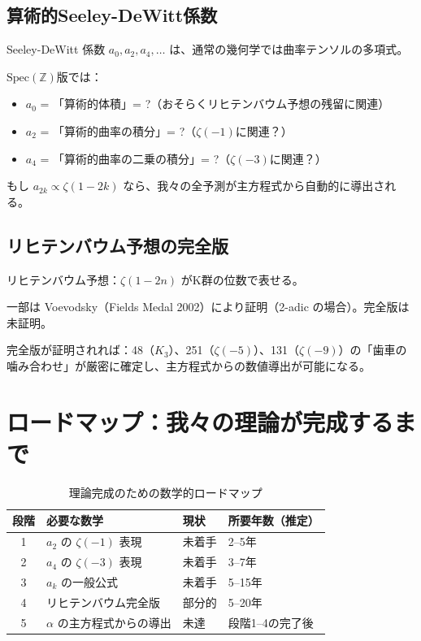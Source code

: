 \documentclass[12pt,a4paper]{article}
\newcommand{\Spec}{\mathrm{Spec}}
\begin{document}
\subsection{算術的Seeley-DeWitt係数}

Seeley-DeWitt 係数 $a_0, a_2, a_4, \ldots$ は、通常の幾何学では曲率テンソルの多項式。

$\Spec(\mathbb{Z})$版では：
\begin{itemize}
\item $a_0$ = 「算術的体積」= ?（おそらくリヒテンバウム予想の残留に関連）
\item $a_2$ = 「算術的曲率の積分」= ?（$\zeta(-1)$に関連？）
\item $a_4$ = 「算術的曲率の二乗の積分」= ?（$\zeta(-3)$に関連？）
\end{itemize}

もし $a_{2k} \propto \zeta(1-2k)$ なら、我々の全予測が主方程式から自動的に導出される。

\subsection{リヒテンバウム予想の完全版}

リヒテンバウム予想：$\zeta(1-2n)$ がK群の位数で表せる。

一部は Voevodsky（Fields Medal 2002）により証明（2-adic の場合）。完全版は未証明。

完全版が証明されれば：48（$K_3$）、251（$\zeta(-5)$）、131（$\zeta(-9)$）の「歯車の噛み合わせ」が厳密に確定し、主方程式からの数値導出が可能になる。

\section{ロードマップ：我々の理論が完成するまで}

\begin{table}[h]
\centering
\caption{理論完成のための数学的ロードマップ}
\small
\begin{tabular}{@{}clll@{}}
\toprule
段階 & 必要な数学 & 現状 & 所要年数（推定） \\
\midrule
1 & $a_2$ の $\zeta(-1)$ 表現 & 未着手 & 2--5年 \\
2 & $a_4$ の $\zeta(-3)$ 表現 & 未着手 & 3--7年 \\
3 & $a_k$ の一般公式 & 未着手 & 5--15年 \\
4 & リヒテンバウム完全版 & 部分的 & 5--20年 \\
5 & $\alpha$ の主方程式からの導出 & 未達 & 段階1--4の完了後 \\
\bottomrule
\end{tabular}
\end{table}
\end{document}
